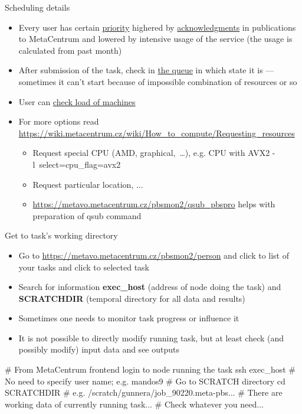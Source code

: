\documentclass[compress, ucs, xelatex, 11pt, xcolor=x11names, aspectratio=1609,
	hyperref={
		bookmarks=true,
		unicode=true,
		colorlinks=true,
		pdftitle={HybSeq course},
		plainpages=false,
		pdfauthor={Vojtech Zeisek},
		pdfsubject={Practical processing of HybSeq target enrichment sequencing data on computing grids like MetaCentrum},
		pdfcreator={XeLaTeX},
		pdfkeywords={BASH, command line, GNU, HybSeq, Linux, MetaCentrum, sequencing shell, target enrichment},
		linkcolor=Cyan2, %
		anchorcolor=Firebrick2, %
		citecolor=Firebrick2, %
		filecolor=Firebrick2, %
		menucolor=Firebrick2, %
		urlcolor=Chartreuse2, %
		pdftex},
	url={hyphens, lowtilde} %
	]{beamer}
\renewcommand{\texttt}[1]{\colorbox{Snow4}{{\ttfamily #1}}}
\begin{document}
\begin{frame}[allowframebreaks]{Scheduling details}
\begin{itemize}
		\item Every user has certain \href{https://metavo.metacentrum.cz/pbsmon2/users/}{priority} highered by \href{https://wiki.metacentrum.cz/wiki/Usage_rules/Acknowledgement}{acknowledgments} in publications to MetaCentrum and lowered by intensive usage of the service (the usage is calculated from past month)
		\item After submission of the task, check in \href{https://metavo.metacentrum.cz/pbsmon2/queues/jobsQueued}{the queue} in which state it is --- sometimes it can't start because of impossible combination of resources or so
		\item User can \href{https://metavo.metacentrum.cz/pbsmon2/nodes/physical}{check load of machines}
		\item For more options read \url{https://wiki.metacentrum.cz/wiki/How_to_compute/Requesting_resources}
		\begin{itemize}
			\item Request special CPU (AMD, graphical,~\ldots), e.g. CPU with AVX2 -\texttt{l~select=cpu\_flag=avx2}
			\item Request particular location, ...
			\item \url{https://metavo.metacentrum.cz/pbsmon2/qsub_pbspro} helps with preparation of \texttt{qsub} command
		\end{itemize}
	\end{itemize}
\end{frame}

\begin{frame}[fragile]{Get to task's working directory}
	\begin{itemize}
		\item Go to \url{https://metavo.metacentrum.cz/pbsmon2/person} and click to list of your tasks and click to selected task
		\item Search for information \textbf{exec\_host} (address of node doing the task) and \textbf{SCRATCHDIR} (temporal directory for all data and results)
		\item Sometimes one needs to monitor task progress or influence it
		\item It is not possible to directly modify running task, but at least check (and possibly modify) input data and see outputs
	\end{itemize}
	\begin{bashcode}
    # From MetaCentrum frontend login to node running the task
    ssh exec_host # No need to specify user name; e.g. mandos9
    # Go to SCRATCH directory
    cd SCRATCHDIR # e.g. /scratch/gunnera/job_90220.meta-pbs...
    # There are working data of currently running task...
    # Check whatever you need...
	\end{bashcode}
\end{frame}
\end{document}
